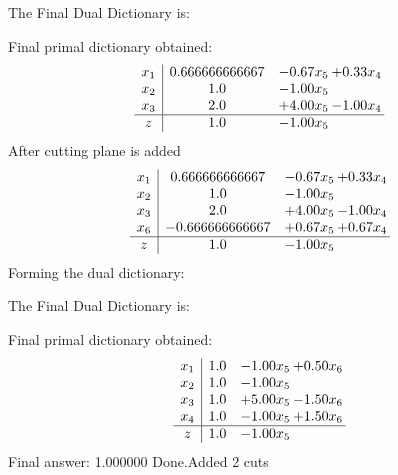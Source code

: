 \documentclass[8pt]{article}
\begin{document}
The Final Dual Dictionary is: 

 Final primal dictionary obtained: 
\[\begin{array}{c| c c@{\hskip 2pt} c@{\hskip 2pt} }
 x_{1}   &  0.666666666667 & -0.67 x_{5} & +  0.33 x_{4}\\
 x_{2}   &  1.0 & -1.00 x_{5} &   \\
 x_{3}   &  2.0 & +  4.00 x_{5} & -1.00 x_{4}\\
\hline
z    &  1.0 & -1.00 x_{5} &   \\
\end{array}\]
 After cutting plane is added 
\[\begin{array}{c| c c@{\hskip 2pt} c@{\hskip 2pt} }
 x_{1}   &  0.666666666667 & -0.67 x_{5} & +  0.33 x_{4}\\
 x_{2}   &  1.0 & -1.00 x_{5} &   \\
 x_{3}   &  2.0 & +  4.00 x_{5} & -1.00 x_{4}\\
 x_{6}   &  -0.666666666667 & +  0.67 x_{5} & +  0.67 x_{4}\\
\hline
z    &  1.0 & -1.00 x_{5} &   \\
\end{array}\]
Forming the dual dictionary:

The Final Dual Dictionary is: 

 Final primal dictionary obtained: 
\[\begin{array}{c| c c@{\hskip 2pt} c@{\hskip 2pt} }
 x_{1}   &  1.0 & -1.00 x_{5} & +  0.50 x_{6}\\
 x_{2}   &  1.0 & -1.00 x_{5} &   \\
 x_{3}   &  1.0 & +  5.00 x_{5} & -1.50 x_{6}\\
 x_{4}   &  1.0 & -1.00 x_{5} & +  1.50 x_{6}\\
\hline
z    &  1.0 & -1.00 x_{5} &   \\
\end{array}\]
 Final answer: 1.000000 
Done.Added 2 cuts 
\end{document}
